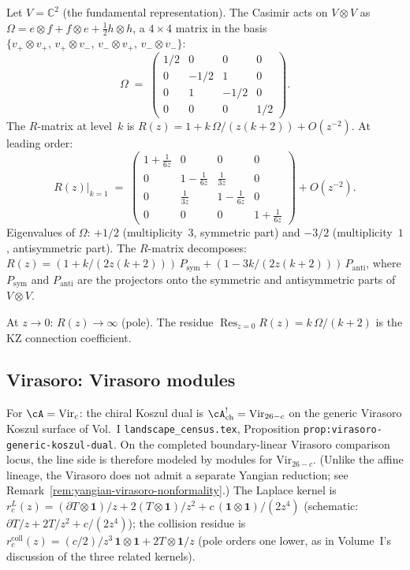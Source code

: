 \begin{computation}
\label{comp:explicit-r-matrix-sl2}
Let $V=\mathbb C^2$ (the fundamental representation).
The Casimir acts on $V\otimes V$ as
$\Omega=e\otimes f+f\otimes e+\tfrac12 h\otimes h$,
a $4\times 4$ matrix in the basis $\{v_+\otimes v_+,\,
v_+\otimes v_-,\,v_-\otimes v_+,\,v_-\otimes v_-\}$:
\[
\Omega
\;=\;
\begin{pmatrix}
1/2 & 0 & 0 & 0 \\
0 & -1/2 & 1 & 0 \\
0 & 1 & -1/2 & 0 \\
0 & 0 & 0 & 1/2
\end{pmatrix}.
\]
The $R$-matrix at level~$k$ is
$R(z)=1+k\,\Omega/(z(k{+}2))+O(z^{-2})$. At leading order:
\[
R(z)\big|_{k=1}
\;=\;
\begin{pmatrix}
1+\frac{1}{6z} & 0 & 0 & 0 \\[3pt]
0 & 1-\frac{1}{6z} & \frac{1}{3z} & 0 \\[3pt]
0 & \frac{1}{3z} & 1-\frac{1}{6z} & 0 \\[3pt]
0 & 0 & 0 & 1+\frac{1}{6z}
\end{pmatrix}
+O(z^{-2}).
\]
Eigenvalues of $\Omega$: $+1/2$ (multiplicity~$3$, symmetric
part) and $-3/2$ (multiplicity~$1$, antisymmetric part).
The $R$-matrix decomposes:
$R(z)=(1+k/(2z(k{+}2)))\,P_{\mathrm{sym}}
+(1-3k/(2z(k{+}2)))\,P_{\mathrm{anti}}$,
where $P_{\mathrm{sym}}$ and $P_{\mathrm{anti}}$ are the
projectors onto the symmetric and antisymmetric parts
of $V\otimes V$.

At $z\to 0$: $R(z)\to\infty$ (pole). The residue
$\operatorname{Res}_{z=0}R(z)=k\,\Omega/(k{+}2)$ is the
KZ connection coefficient.
\end{computation}

\subsection{Virasoro: Virasoro modules}
\label{subsec:line-op-virasoro}

For $\cA=\mathrm{Vir}_c$: the chiral Koszul dual is
$\cA^!_{\mathrm{ch}}=\mathrm{Vir}_{26-c}$ on the generic
Virasoro Koszul surface of Vol.~I
\texttt{landscape\_census.tex}, Proposition
\texttt{prop:virasoro-generic-koszul-dual}.
On the completed boundary-linear Virasoro comparison locus, the
line side is therefore modeled by modules for $\mathrm{Vir}_{26-c}$.
(Unlike the affine lineage, the Virasoro does not admit a
separate Yangian reduction; see
Remark~\textup{\ref{rem:yangian-virasoro-nonformality}}.)
The Laplace kernel is
$r^L_c(z)=(\partial T \otimes \mathbf{1})/z+2(T \otimes \mathbf{1})/z^2+c\,(\mathbf{1}\otimes\mathbf{1})/(2z^4)$
(schematic: $\partial T/z+2T/z^2+c/(2z^4)$);
the collision residue is
$r^{\mathrm{coll}}_c(z) = (c/2)/z^3\,\mathbf{1}\otimes\mathbf{1}
+ 2T\otimes\mathbf{1}/z$
(pole orders one lower, as in Volume~I's discussion of the three
related kernels).

